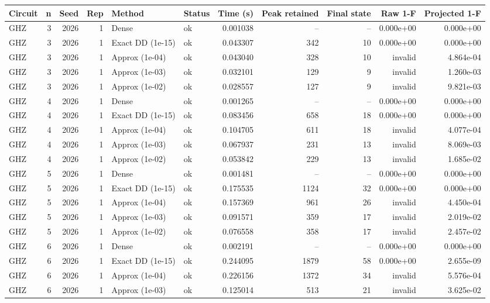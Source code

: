 \begin{tabular}{lrrrllrrrrr}
\hline
Circuit & n & Seed & Rep & Method & Status & Time (s) & Peak retained & Final state & Raw 1-F & Projected 1-F \\
\hline
GHZ & 3 & 2026 & 1 & Dense & ok & 0.001038 & -- & -- & 0.000e+00 & 0.000e+00 \\
GHZ & 3 & 2026 & 1 & Exact DD (1e-15) & ok & 0.043307 & 342 & 10 & 0.000e+00 & 0.000e+00 \\
GHZ & 3 & 2026 & 1 & Approx (1e-04) & ok & 0.043040 & 328 & 10 & invalid & 4.864e-04 \\
GHZ & 3 & 2026 & 1 & Approx (1e-03) & ok & 0.032101 & 129 & 9 & invalid & 1.260e-03 \\
GHZ & 3 & 2026 & 1 & Approx (1e-02) & ok & 0.028557 & 127 & 9 & invalid & 9.821e-03 \\
GHZ & 4 & 2026 & 1 & Dense & ok & 0.001265 & -- & -- & 0.000e+00 & 0.000e+00 \\
GHZ & 4 & 2026 & 1 & Exact DD (1e-15) & ok & 0.083456 & 658 & 18 & 0.000e+00 & 0.000e+00 \\
GHZ & 4 & 2026 & 1 & Approx (1e-04) & ok & 0.104705 & 611 & 18 & invalid & 4.077e-04 \\
GHZ & 4 & 2026 & 1 & Approx (1e-03) & ok & 0.067937 & 231 & 13 & invalid & 8.069e-03 \\
GHZ & 4 & 2026 & 1 & Approx (1e-02) & ok & 0.053842 & 229 & 13 & invalid & 1.685e-02 \\
GHZ & 5 & 2026 & 1 & Dense & ok & 0.001481 & -- & -- & 0.000e+00 & 0.000e+00 \\
GHZ & 5 & 2026 & 1 & Exact DD (1e-15) & ok & 0.175535 & 1124 & 32 & 0.000e+00 & 0.000e+00 \\
GHZ & 5 & 2026 & 1 & Approx (1e-04) & ok & 0.157369 & 961 & 26 & invalid & 4.450e-04 \\
GHZ & 5 & 2026 & 1 & Approx (1e-03) & ok & 0.091571 & 359 & 17 & invalid & 2.019e-02 \\
GHZ & 5 & 2026 & 1 & Approx (1e-02) & ok & 0.076558 & 358 & 17 & invalid & 2.457e-02 \\
GHZ & 6 & 2026 & 1 & Dense & ok & 0.002191 & -- & -- & 0.000e+00 & 0.000e+00 \\
GHZ & 6 & 2026 & 1 & Exact DD (1e-15) & ok & 0.244095 & 1879 & 58 & 0.000e+00 & 2.655e-09 \\
GHZ & 6 & 2026 & 1 & Approx (1e-04) & ok & 0.226156 & 1372 & 34 & invalid & 5.576e-04 \\
GHZ & 6 & 2026 & 1 & Approx (1e-03) & ok & 0.125014 & 513 & 21 & invalid & 3.625e-02 \\

\end{tabular}
